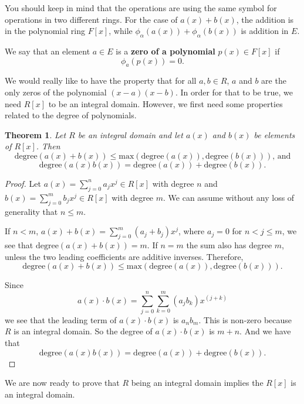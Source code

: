 \documentclass[
]{book}
\newtheorem{theorem}{Theorem}[chapter]
\theoremstyle{definition}
\theoremstyle{definition}
\theoremstyle{definition}
\theoremstyle{remark}
\begin{document}
You should keep in mind that the operations are using the same symbol for operations in two different rings. For the case of \(a(x)+b(x)\), the addition is in the polynomial ring \(F[x]\), while \(\phi_\alpha \left(a(x)\right) + \phi_\alpha \left(b(x)\right)\) is addition in \(E\).

We say that an element \(a \in E\) is a \textbf{zero of a polynomial} \(p(x)\in F[x]\) if \[\phi_a ( p(x))=0.\]

We would really like to have the property that for all \(a,b \in R\), \(a\) and \(b\) are the only zeros of the polynomial \((x-a)(x-b)\).
In order for that to be true, we need \(R[x]\) to be an integral domain. However, we first need some properties related to the degree of polynomials.

\begin{theorem}
\protect\hypertarget{thm:unnamed-chunk-191}{}{\label{thm:unnamed-chunk-191} }Let \(R\) be an integral domain and let \(a(x)\) and \(b(x)\) be elements of \(R[x]\). Then
\[\mathrm{degree}(a(x)+b(x))\leq \mathrm{max}\left( \mathrm{degree}(a(x)), \mathrm{degree}(b(x))\right) \mbox{, and}\]
\[\mathrm{degree}\left( a(x) b(x)\right) = \mathrm{degree}(a(x))+\mathrm{degree}(b(x)).\]
\end{theorem}

\begin{proof}
{}Let \(a(x)=\sum_{j=0}^n a_j x^j \in R[x]\) with degree \(n\) and \(b(x)=\sum_{j=0}^m b_j x^j\in R[x]\) with degree \(m\). We can assume without any loss of generality that \(n\leq m\).

If \(n<m\), \(a(x)+b(x) = \sum_{j=0}^m (a_j+b_j) x^j\), where \(a_j=0\) for \(n<j\leq m\), we see that \(\mathrm{degree} (a(x)+b(x)) =m\). If \(n=m\) the sum also has degree \(m\), unless the two leading coefficients are additive inverses. Therefore, \[\mathrm{degree}(a(x)+b(x))\leq \mathrm{max}\left( \mathrm{degree}(a(x)), \mathrm{degree}(b(x))\right).\]

Since
\[a(x) \cdot b(x)  = \sum_{j=0}^n \sum_{k=0}^m \left(a_j b_k\right) x^{(j+k)}\] we see that the leading term of \(a(x)\cdot b(x)\) is \(a_n b_m\). This is non-zero because \(R\) is an integral domain. So the degree of \(a(x) \cdot b(x)\) is \(m+n\). And we have that \[\mathrm{degree}\left( a(x) b(x)\right) = \mathrm{degree}(a(x))+\mathrm{degree}(b(x)).\]
\end{proof}

We are now ready to prove that \(R\) being an integral domain implies the \(R[x]\) is an integral domain.
\end{document}
